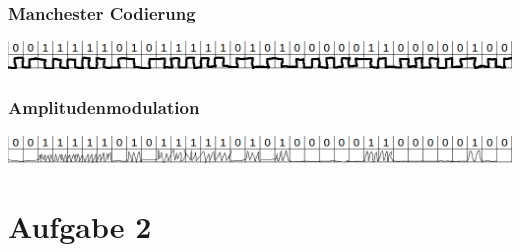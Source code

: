 \documentclass[numbers=noendperiod]{scrartcl}
\begin{document}
\subsubsection*{Manchester Codierung}
\includegraphics[width=1.0\textwidth]{manchester.png}
\subsubsection*{Amplitudenmodulation}
\includegraphics[width=1.0\textwidth]{amplitude.png}
\section*{Aufgabe 2}
\end{document}
